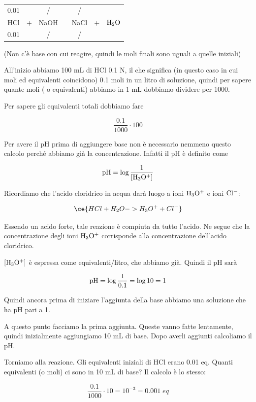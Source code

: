 \begin{center}
    \begin{tabular}{ccccccc}
        0.01 &  & / & & / & &\\
        HCl & + & NaOH & \ce{->} & NaCl & + & $\rm H_2O$\\
        0.01 &  &  / & & / & &\\
    \end{tabular}
\end{center}

(Non c'è base con cui reagire, quindi le moli finali sono uguali a quelle iniziali)

All'inizio abbiamo 100 mL di HCl 0.1 N, il che significa (in questo caso in cui moli ed equivalenti coincidono) 0.1 moli in un litro di soluzione, quindi per sapere quante moli ( o equivalenti) abbiamo in 1 mL dobbiamo dividere per 1000.

Per sapere gli equivalenti totali dobbiamo fare

$$\frac{0.1}{1000} \cdot 100$$

Per avere il pH prima di aggiungere base non è necessario nemmeno questo calcolo perché abbiamo già la concentrazione. Infatti il pH è definito come

$$\rm pH=\log \frac{1}{[H_3O^+]}$$

Ricordiamo che l'acido cloridrico in acqua darà luogo a ioni $\rm H_3O^+$ e ioni $\rm Cl^-$:

$$\ce{HCl + H_2O -> H_3O^+ + Cl^-}$$

Essendo un acido forte, tale reazione è compiuta da tutto l'acido. Ne segue che la concentrazione degli ioni $\rm H_3O^+$ corrisponde alla concentrazione dell'acido cloridrico.

$\rm [H_3O^+]$ è espressa come equivalenti/litro, che abbiamo già. Quindi il pH sarà

$$\rm pH=\log\frac{1}{0.1}=\log10=1$$

Quindi ancora prima di iniziare l'aggiunta della base abbiamo una soluzione che ha pH pari a 1.

A questo punto facciamo la prima aggiunta. Queste vanno fatte lentamente, quindi inizialmente aggiungiamo 10 mL di base. Dopo averli aggiunti calcoliamo il pH.

Torniamo alla reazione. Gli equivalenti iniziali di HCl erano 0.01 eq. Quanti equivalenti (o moli) ci sono in 10 mL di base? Il calcolo è lo stesso:

$$\frac{0.1}{1000} \cdot 10=10^{-3}=0.001 \; eq$$

